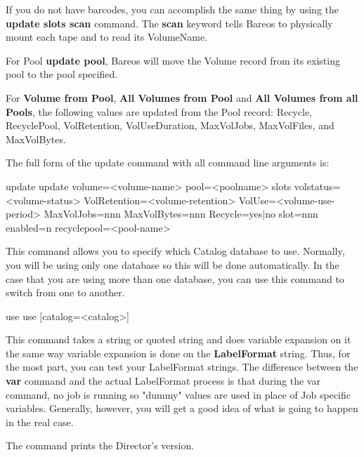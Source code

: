 \begin{description}
   If you do not have barcodes, you can accomplish the same thing
   by using the {\bf update slots scan} command.
   The {\bf scan} keyword tells Bareos to physically mount each tape and to
   read its VolumeName.

   For Pool {\bf update pool}, Bareos will move the Volume record from its
   existing pool to the pool specified.

   For {\bf Volume from Pool}, {\bf All Volumes from Pool} and {\bf All Volumes
     from all Pools}, the following values are updated from the Pool record:
   Recycle, RecyclePool, VolRetention, VolUseDuration, MaxVolJobs, MaxVolFiles,
   and MaxVolBytes.

   The full form of the update command with all command line arguments is:

\begin{bconsole}{update}
update volume=<volume-name> pool=<poolname>
  slots volstatus=<volume-status> VolRetention=<volume-retention>
  VolUse=<volume-use-period> MaxVolJobs=nnn MaxVolBytes=nnn Recycle=yes|no
  slot=nnn enabled=n recyclepool=<pool-name>
\end{bconsole}


\item [use]
   This command allows you to specify which Catalog  database to use. Normally,
   you will be using only one database so  this will be done automatically. In
   the case that you are using  more than one database, you can use this command
   to switch from  one to another.

\begin{bconsole}{use}
use [catalog=<catalog>]
\end{bconsole}

\item [var]
   \label{var}
   This command takes a string or quoted string and  does variable expansion on
   it the same way variable expansion  is done on the {\bf LabelFormat} string.
   Thus, for the  most part, you can test your LabelFormat strings. The
   difference  between the {\bf var} command and the actual LabelFormat process
   is that during the var command, no job is running so "dummy"  values are
   used in place of Job specific variables. Generally,  however, you will get a
   good idea of what is going to happen  in the real case.

\item [version]
   The command prints the Director's version.


\end{description}
